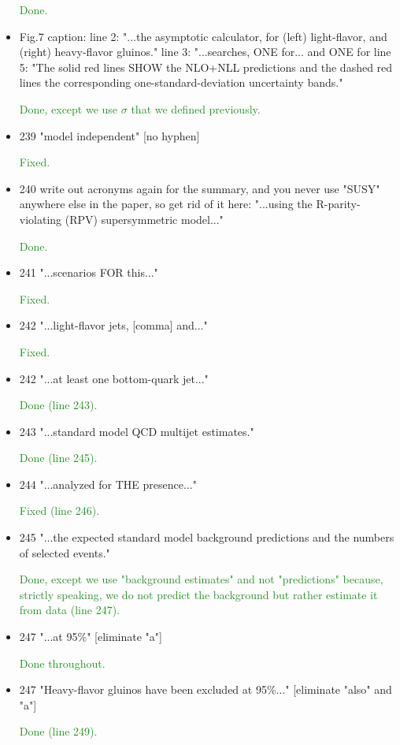 \documentclass[paper=a4, fontsize=11pt]{scrartcl}
\begin{document}
\begin{itemize}
\textcolor{ForestGreen}{Done.}

\item Fig.7 caption:
 line 2: "...the asymptotic calculator, for (left) light-flavor,
   and (right) heavy-flavor gluinos."
 line 3: "...searches, ONE for... and ONE for
 line 5: "The solid red lines SHOW the NLO+NLL predictions
   and the dashed red lines the corresponding one-standard-deviation
   uncertainty bands."
   
\textcolor{ForestGreen}{Done, except we use $\sigma$ that we defined previously.}

\item 239 "model independent" [no hyphen]

\textcolor{ForestGreen}{Fixed.}

\item 240 write out acronyms again for the summary, and you never use "SUSY"
 anywhere else in the paper, so get rid of it here:
 "...using the R-parity-violating (RPV) supersymmetric model..."
 
\textcolor{ForestGreen}{Done.}

\item 241 "...scenarios FOR this..."

\textcolor{ForestGreen}{Fixed.}

\item 242 "...light-flavor jets, [comma] and..."

\textcolor{ForestGreen}{Fixed.}

\item 242 "...at least one bottom-quark jet..."

\textcolor{ForestGreen}{Done (line 243).}

\item 243 "...standard model QCD multijet estimates."

\textcolor{ForestGreen}{Done (line 245).}

\item 244 "...analyzed for THE presence..."

\textcolor{ForestGreen}{Fixed (line 246).}

\item 245 "...the expected standard model background predictions and
 the numbers of selected events."
 
\textcolor{ForestGreen}{Done, except we use "background estimates" and not "predictions"
because, strictly speaking, we do not predict the background but rather estimate it from data
(line 247).}

\item 247 "...at 95\%" [eliminate "a"]

\textcolor{ForestGreen}{Done throughout.}

\item 247 "Heavy-flavor gluinos have been excluded at 95\%..."
 [eliminate "also" and "a"]
 
\textcolor{ForestGreen}{Done (line 249).}
\end{itemize}
\end{document}

